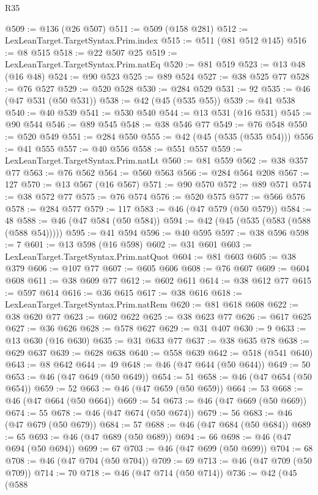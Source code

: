 \begin{lexlean}{R35}
\begin{coremodule}
@509 := @136 (@26 @507)
@511 := @509 (@158 @281)
@512 := LexLeanTarget.TargetSyntax.Prim.index
@515 := @511 (@81 @512 @145)
@516 := @8 @515
@518 := @22 @507 @25
@519 := LexLeanTarget.TargetSyntax.Prim.natEq
@520 := @81 @519
@523 := @13 @48 (@16 @48)
@524 := @90 @523
@525 := @89 @524
@527 := @38 @525 @77
@528 := @76 @527
@529 := @520 @528
@530 := @284 @529
@531 := 92
@535 := @46 (@47 @531 (@50 @531))
@538 := @42 (@45 (@535 @55))
@539 := @41 @538
@540 := @40 @539
@541 := @530 @540
@544 := @13 @531 (@16 @531)
@545 := @90 @544
@546 := @89 @545
@548 := @38 @546 @77
@549 := @76 @548
@550 := @520 @549
@551 := @284 @550
@555 := @42 (@45 (@535 (@535 @54)))
@556 := @41 @555
@557 := @40 @556
@558 := @551 @557
@559 := LexLeanTarget.TargetSyntax.Prim.natLt
@560 := @81 @559
@562 := @38 @357 @77
@563 := @76 @562
@564 := @560 @563
@566 := @284 @564 @208
@567 := 127
@570 := @13 @567 (@16 @567)
@571 := @90 @570
@572 := @89 @571
@574 := @38 @572 @77
@575 := @76 @574
@576 := @520 @575
@577 := @566 @576
@578 := @284 @577
@579 := 117
@583 := @46 (@47 @579 (@50 @579))
@584 := 48
@588 := @46 (@47 @584 (@50 @584))
@594 := @42 (@45 (@535 (@583 (@588 (@588 @54)))))
@595 := @41 @594
@596 := @40 @595
@597 := @38 @596
@598 := 7
@601 := @13 @598 (@16 @598)
@602 := @31 @601
@603 := LexLeanTarget.TargetSyntax.Prim.natQuot
@604 := @81 @603
@605 := @38 @379
@606 := @107 @77
@607 := @605 @606
@608 := @76 @607
@609 := @604 @608
@611 := @38 @609 @77
@612 := @602 @611
@614 := @38 @612 @77
@615 := @597 @614
@616 := @36 @615
@617 := @38 @616
@618 := LexLeanTarget.TargetSyntax.Prim.natRem
@620 := @81 @618 @608
@622 := @38 @620 @77
@623 := @602 @622
@625 := @38 @623 @77
@626 := @617 @625
@627 := @36 @626
@628 := @578 @627
@629 := @31 @407
@630 := 9
@633 := @13 @630 (@16 @630)
@635 := @31 @633 @77
@637 := @38 @635 @78
@638 := @629 @637
@639 := @628 @638
@640 := @558 @639
@642 := @518 (@541 @640)
@643 := @8 @642
@644 := 49
@648 := @46 (@47 @644 (@50 @644))
@649 := 50
@653 := @46 (@47 @649 (@50 @649))
@654 := 51
@658 := @46 (@47 @654 (@50 @654))
@659 := 52
@663 := @46 (@47 @659 (@50 @659))
@664 := 53
@668 := @46 (@47 @664 (@50 @664))
@669 := 54
@673 := @46 (@47 @669 (@50 @669))
@674 := 55
@678 := @46 (@47 @674 (@50 @674))
@679 := 56
@683 := @46 (@47 @679 (@50 @679))
@684 := 57
@688 := @46 (@47 @684 (@50 @684))
@689 := 65
@693 := @46 (@47 @689 (@50 @689))
@694 := 66
@698 := @46 (@47 @694 (@50 @694))
@699 := 67
@703 := @46 (@47 @699 (@50 @699))
@704 := 68
@708 := @46 (@47 @704 (@50 @704))
@709 := 69
@713 := @46 (@47 @709 (@50 @709))
@714 := 70
@718 := @46 (@47 @714 (@50 @714))
@736 := @42
    (@45
      (@588

\end{coremodule}
\end{lexlean}
